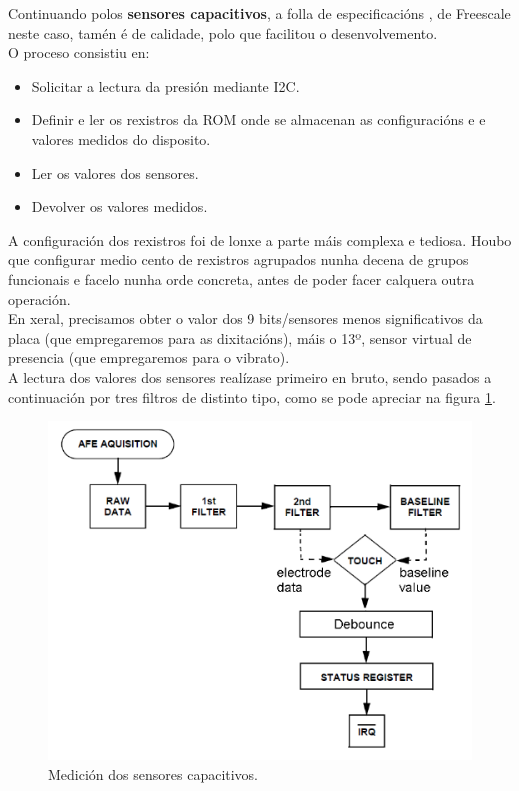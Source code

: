    Continuando polos \textbf{sensores capacitivos}, a folla de especificacións
   \cite{MPR121}, de Freescale neste caso, tamén é de calidade, polo que
   facilitou o desenvolvemento. \\
   
   O proceso consistiu en:
    
    \begin{itemize}
    \item Solicitar a lectura da presión mediante I2C.
    \item Definir e ler os rexistros da ROM onde se almacenan as configuracións
        e e valores medidos do disposito.
    \item Ler os valores dos sensores.
    \item Devolver os valores medidos.
   \end{itemize}
   
   A configuración dos rexistros foi de lonxe a parte máis complexa e tediosa.
   Houbo que configurar medio cento de rexistros agrupados nunha decena de
   grupos funcionais e facelo nunha orde concreta, antes de poder facer calquera
   outra operación. \\
   
   En xeral, precisamos obter o valor dos 9 bits/sensores menos significativos
   da placa (que empregaremos para as dixitacións), máis o 13º, sensor virtual
   de presencia (que empregaremos para o vibrato). \\
   
   A lectura dos valores dos sensores realízase primeiro en bruto, sendo pasados
   a continuación por tres filtros de distinto tipo, como se pode apreciar na
   figura \ref{figura:Mpr121Medicion}. \\
   
   \begin{figure}[htbp]
    \centering
    \includegraphics[scale=0.6, keepaspectratio=true]{./imagenes/mpr121-medicion.png}
    \caption{Medición dos sensores capacitivos.}
    \label{figura:Mpr121Medicion}
   \end{figure}
   
